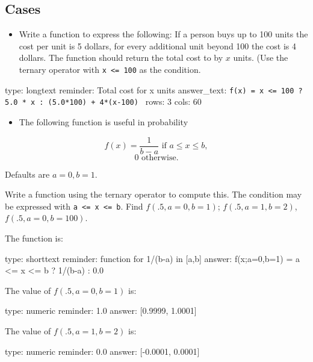 \documentclass[12pt]{article}
\begin{document}
\subsection{Cases}

\begin{itemize}
\itemsep1pt\parskip0pt
\item
  Write a function to express the following: If a person buys up to 100
  units the cost per unit is 5 dollars, for every additional unit beyond
  100 the cost is 4 dollars. The function should return the total cost
  to by $x$ units. (Use the ternary operator with
  \texttt{x \textless{}= 100} as the condition.
\end{itemize}

\begin{answer}
type: longtext
reminder: Total cost for x units
answer_text: \verb#f(x) = x <= 100 ? 5.0 * x : (5.0*100) + 4*(x-100) # 
rows: 3
cols: 60
\end{answer}

\begin{itemize}
\itemsep1pt\parskip0pt
\item
  The following function is useful in probability
\end{itemize}

\[
f(x)= \frac{1}{b-a} \text{ if } a \leq x \leq b, 
\] \[
0  \text{ otherwise.}
\]

Defaults are $a=0, b=1$.

Write a function using the ternary operator to compute this. The
condition may be expressed with
\texttt{a \textless{}= x \textless{}= b}. Find $f(.5, a=0, b=1)$;
$f(.5, a=1, b=2)$, $f(.5,a=0, b=100)$.

The function is:

\begin{answer}
type: shorttext
reminder: function for 1/(b-a) in [a,b]
answer: f(x;a=0,b=1) = a <= x <= b ? 1/(b-a) : 0.0

\end{answer}

The value of $f(.5, a=0, b=1)$ is:

\begin{answer}
    type: numeric
    reminder: 1.0
    answer: [0.9999, 1.0001]

\end{answer}

The value of $f(.5, a=1, b=2)$ is:

\begin{answer}
    type: numeric
    reminder: 0.0
    answer: [-0.0001, 0.0001]

\end{answer}
\end{document}
